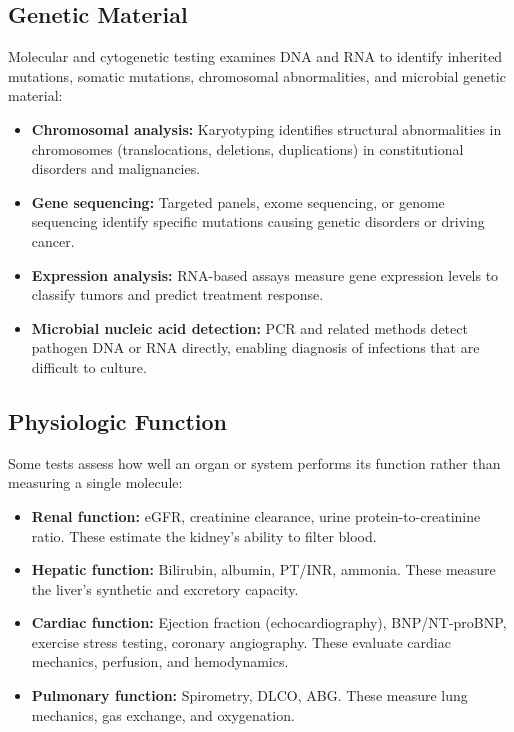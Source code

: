 \subsection{Genetic Material}

Molecular and cytogenetic testing examines DNA and RNA to identify inherited mutations, somatic mutations, chromosomal abnormalities, and microbial genetic material:

\begin{itemize}
    \item \textbf{Chromosomal analysis:} Karyotyping identifies structural abnormalities in chromosomes (translocations, deletions, duplications) in constitutional disorders and malignancies.
    \item \textbf{Gene sequencing:} Targeted panels, exome sequencing, or genome sequencing identify specific mutations causing genetic disorders or driving cancer.
    \item \textbf{Expression analysis:} RNA-based assays measure gene expression levels to classify tumors and predict treatment response.
    \item \textbf{Microbial nucleic acid detection:} PCR and related methods detect pathogen DNA or RNA directly, enabling diagnosis of infections that are difficult to culture.
\end{itemize}

\subsection{Physiologic Function}

Some tests assess how well an organ or system performs its function rather than measuring a single molecule:

\begin{itemize}
    \item \textbf{Renal function:} eGFR, creatinine clearance, urine protein-to-creatinine ratio. These estimate the kidney's ability to filter blood.
    \item \textbf{Hepatic function:} Bilirubin, albumin, PT/INR, ammonia. These measure the liver's synthetic and excretory capacity.
    \item \textbf{Cardiac function:} Ejection fraction (echocardiography), BNP/NT-proBNP, exercise stress testing, coronary angiography. These evaluate cardiac mechanics, perfusion, and hemodynamics.
    \item \textbf{Pulmonary function:} Spirometry, DLCO, ABG. These measure lung mechanics, gas exchange, and oxygenation.
\end{itemize}

